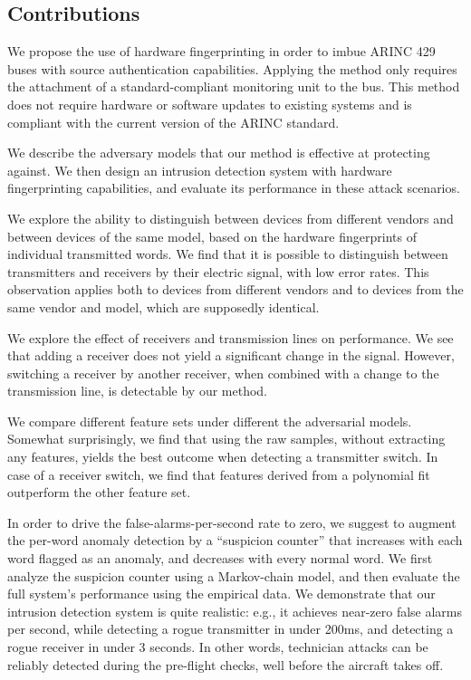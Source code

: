 \documentclass[compsoc,conference,a4paper,10pt,times]{IEEEtran}
\newcommand{\sublevel}[1]{\subsection{#1}}
\newcommand{\sublevel}[1]{\section{#1}}
\begin{document}
\sublevel{Contributions}
  We propose the use of hardware fingerprinting in order to imbue ARINC 429 buses with source authentication capabilities. Applying the method only requires the attachment of a standard-compliant monitoring unit to the bus. This method does not require hardware or software updates to existing systems and is compliant with the current version of the ARINC standard.
  
  We describe the adversary models that our method is effective at protecting against. We then design an intrusion detection system with hardware fingerprinting capabilities, and evaluate its performance in these attack scenarios.
  
  We explore the ability to distinguish between devices from different vendors and between devices of the same model, based on the hardware fingerprints of individual transmitted words. We find that it is possible to distinguish between transmitters and receivers by their electric signal, with low error rates. This observation applies both to devices from different vendors and to devices from the same vendor and model, which are supposedly identical.
  
  We explore the effect of receivers and transmission lines on performance. We see that adding a receiver does not yield a significant change in the signal. However, switching a receiver by another receiver, when combined with a change to the transmission line, is detectable by our method.
  
  We compare different feature sets under different the adversarial models. Somewhat surprisingly, we find that using the raw samples, without extracting any features, yields the best outcome when detecting a transmitter switch. In case of a receiver switch, we find that features derived from a polynomial fit outperform the other feature set.
  
  In order to drive the false-alarms-per-second rate to zero, we suggest to augment the per-word anomaly detection by a ``suspicion counter'' that increases with each word flagged as an anomaly, and decreases with every normal word. We first analyze the suspicion counter using a Markov-chain model, and then evaluate the full system's performance using the empirical data. 
   We demonstrate that our intrusion detection system is quite realistic: e.g., it achieves near-zero false alarms per second, while detecting a rogue transmitter in under 200ms, and detecting a rogue receiver in under 3 seconds. In other words, technician attacks can be reliably detected during the pre-flight checks, well before the aircraft takes off.
  
\end{document}
